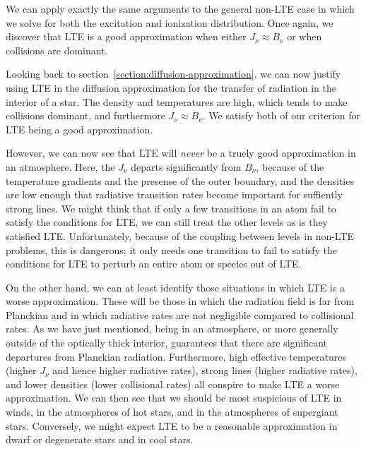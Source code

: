We can apply exactly the same arguments to the general non-LTE case in
which we solve for both the excitation and ionization distribution. Once
again, we discover that LTE is a good approximation when either $J_\nu
\approx B_\nu$ or when collisions are dominant.

Looking back to section~\ref{section:diffusion-approximation}, we can
now justify using LTE in the diffusion approximation for the transfer of
radiation in the interior of a star. The density and temperatures are
high, which tends to make collisions dominant, and furthermore $J_\nu
\approx B_\nu$. We satisfy both of our criterion for LTE being a good
approximation.

However, we can now see that LTE will \emph{never} be a truely good
approximation in an atmosphere. Here, the $J_\nu$ departs significantly
from $B_\nu$, because of the temperature gradients and the presense of
the outer boundary, and the densities are low enough that radiative
transition rates become important for suffiently strong lines. We might
think that if only a few transitions in an atom fail to satisfy the
conditions for LTE, we can still treat the other levels as is they
satisfied LTE. Unfortunately, because of the coupling between levels in
non-LTE problems, this is dangerous; it only needs one transition to
fail to satisfy the conditions for LTE to perturb an entire atom or
species out of LTE.

On the other hand, we can at least identify those situations in which
LTE is a worse approximation. These will be those in which the radiation
field is far from Planckian and in which radiative rates are not
negligible compared to collisional rates. As we have just mentioned,
being in an atmosphere, or more generally outside of the optically thick
interior, guarantees that there are significant departures from
Planckian radiation. Furthermore, high effective temperatures (higher
$J_\nu$ and hence higher radiative rates), strong lines (higher
radiative rates), and lower densities (lower collisional rates) all
conspire to make LTE a worse approximation. We can then see that we
should be most suspicious of LTE in winds, in the atmospheres of hot
stars, and in the atmospheres of supergiant stars. Conversely, we might
expect LTE to be a reasonable approximation in dwarf or degenerate stars
and in cool stars.


